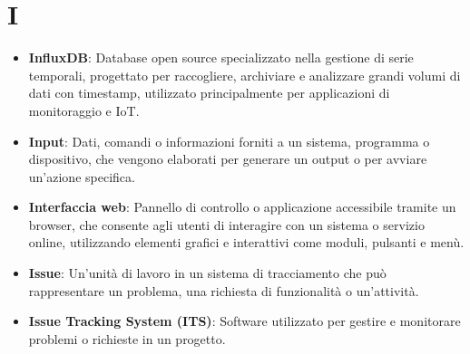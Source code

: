\section*{I}  
\begin{itemize}
    \item \textbf{InfluxDB}: Database open source specializzato nella gestione di serie temporali, progettato per raccogliere, archiviare e analizzare grandi volumi di dati con timestamp, utilizzato principalmente per applicazioni di monitoraggio e IoT.
    \item \textbf{Input}: Dati, comandi o informazioni forniti a un sistema, programma o dispositivo, che vengono elaborati per generare un output o per avviare un'azione specifica.
    \item \textbf{Interfaccia web}: Pannello di controllo o applicazione accessibile tramite un browser, che consente agli utenti di interagire con un sistema o servizio online, utilizzando elementi grafici e interattivi come moduli, pulsanti e menù.
    \item \textbf{Issue}: Un'unità di lavoro in un sistema di tracciamento che può rappresentare un problema, una richiesta di funzionalità o un'attività.
    \item \textbf{Issue Tracking System (ITS)}: Software utilizzato per gestire e monitorare problemi o richieste in un progetto.
\end{itemize}

